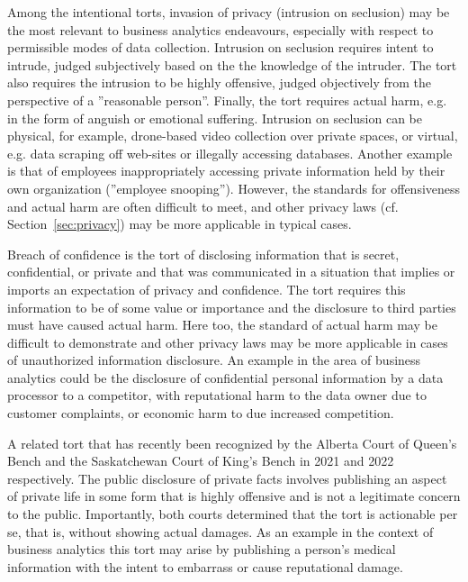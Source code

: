 Among the intentional torts, invasion of privacy (intrusion on seclusion)  may be the most relevant to business analytics endeavours, especially with respect to permissible modes of data collection. Intrusion on seclusion requires intent to intrude, judged subjectively based on the the knowledge of the intruder. The tort also requires the intrusion to be highly offensive, judged objectively from the perspective of a ''reasonable person''. Finally, the tort requires actual harm, e.g. in the form of anguish or emotional suffering. Intrusion on seclusion can be physical, for example, drone-based video collection over private spaces, or virtual, e.g. data scraping off web-sites or illegally accessing databases. Another example is that of employees inappropriately accessing private information held by their own organization (''employee snooping''). However, the standards for offensiveness and actual harm are often difficult to meet, and other privacy laws (cf. Section~\ref{sec:privacy}) may be more applicable in typical cases.

Breach of confidence is the tort of disclosing information that is secret, confidential, or private and that was communicated in a situation that implies or imports an expectation of privacy and confidence. The tort requires this information to be of some value or importance and the disclosure to third parties must have caused actual harm. Here too, the standard of actual harm may be difficult to demonstrate and other privacy laws may be more applicable in cases of unauthorized information disclosure. An example in the area of business analytics could be the disclosure of confidential personal information by a data processor to a competitor, with reputational harm to the data owner due to customer complaints, or economic harm to due increased competition.

A related tort that has recently been recognized by the Alberta Court of Queen's Bench and the Saskatchewan Court of King's Bench in 2021 and 2022 respectively. The public disclosure of private facts involves publishing an aspect of private life in some form that is highly offensive and is not a legitimate concern to the public. Importantly, both courts determined that the tort is actionable per se, that is, without showing actual damages. As an example in the context of business analytics this tort may arise by publishing a person's medical information with the intent to embarrass or cause reputational damage.

